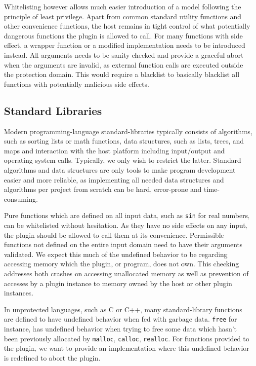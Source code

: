 Whitelisting however allows much easier introduction of a model following the
principle of least privilege. Apart from common standard utility functions and
other convenience functions, the host remains in tight control of what
potentially dangerous functions the plugin is allowed to call. For many
functions with side effect, a wrapper function or a modified implementation
needs to be introduced instead. All arguments needs to be sanity checked and
provide a graceful abort when the arguments are invalid, as external function
calls are executed outside the protection domain. This would require a blacklist
to basically blacklist all functions with potentially malicious side effects.

\subsection {Standard Libraries}

Modern programming-language standard-libraries typically consists of algorithms,
such as sorting lists or math functions, data structures, such as lists, trees,
and maps and interaction with the host platform including input/output and
operating system calls. Typically, we only wish to restrict the latter. Standard
algorithms and data structures are only tools to make program development easier
and more reliable, as implementing all needed data structures and algorithms per
project from scratch can be hard, error-prone and time-consuming.

Pure functions which are defined on all input data, such as \texttt{sin} for
real numbers, can be whitelisted without hesitation. As they have no side
effects on any input, the plugin should be allowed to call them at its
convenience. Permissible functions not defined on the entire input domain need
to have their arguments validated. We expect this much of the undefined behavior
to be regarding accessing memory which the plugin, or program, does not own.
This checking addresses both crashes on accessing unallocated memory as well as
prevention of accesses by a plugin instance to memory owned by the host or other
plugin instances.

In unprotected languages, such as C or C++, many standard-library functions are
defined to have undefined behavior when fed with garbage data. \texttt{free} for
instance, has undefined behavior when trying to free some data which hasn't been
previously allocated by \texttt{malloc}, \texttt{calloc}, \texttt{realloc}. For
functions provided to the plugin, we want to provide an implementation where
this undefined behavior is redefined to abort the plugin.

